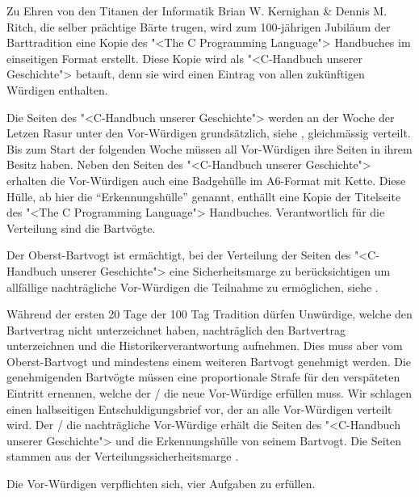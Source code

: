 \documentclass[fontsize=12pt,parskip=half]{scrartcl}
\begin{document}
\begin{contract}

  \Clause[title={"<C-Handbuch unserer Geschichte">}]
  Zu Ehren von den Titanen der Informatik Brian W. Kernighan \& Dennis M. Ritch, die selber prächtige Bärte trugen,
  wird zum 100-jährigen Jubiläum der Barttradition eine Kopie des "<The C Programming Language"> Handbuches im
  einseitigen Format erstellt. Diese Kopie wird als "<C-Handbuch unserer Geschichte"> betauft, denn sie wird einen
  Eintrag von allen zukünftigen Würdigen enthalten.

  \Clause[title={Verteilung}]
  Die Seiten des "<C-Handbuch unserer Geschichte"> werden an der Woche der Letzen Rasur unter den Vor-Würdigen grundsätzlich, siehe , gleichmässig verteilt.
  Bis zum Start der folgenden Woche müssen all Vor-Würdigen ihre Seiten in ihrem Besitz haben.
  Neben den Seiten des "<C-Handbuch unserer Geschichte">
  erhalten die Vor-Würdigen auch eine Badgehülle im A6-Format mit Kette. Diese Hülle, ab hier die ``Erkennungshülle'' genannt, enthällt eine Kopie der
  Titelseite des "<The C Programming Language"> Handbuches. Verantwortlich für die Verteilung sind die Bartvögte.

  \SubClause[title={Verteilungssicherheitsmarge}]\label{H.verteilungsmarge}
  Der Oberst-Bartvogt ist ermächtigt, bei der Verteilung der Seiten des "<C-Handbuch unserer Geschichte"> eine Sicherheitsmarge zu berücksichtigen um allfällige nachträgliche Vor-Würdigen
  die Teilnahme zu ermöglichen, siehe .

  \Clause[title={Nachträgliche Vor-Würdige}]\label{H.nachzug}
  Während der ersten 20 Tage der 100 Tag Tradition dürfen Unwürdige, welche den Bartvertrag nicht unterzeichnet haben, nachträglich den Bartvertrag unterzeichnen und die Historikerverantwortung
  aufnehmen. Dies muss aber vom Oberst-Bartvogt und mindestens einem weiteren Bartvogt genehmigt werden. Die genehmigenden Bartvögte müssen eine proportionale Strafe für den verspäteten Eintritt ernennen,
  welche der / die neue Vor-Würdige erfüllen muss. Wir schlagen einen halbseitigen Entschuldigungsbrief vor, der an alle Vor-Würdigen verteilt wird. Der / die nachträgliche Vor-Würdige erhält die Seiten des "<C-Handbuch unserer Geschichte">
  und die Erkennungshülle von seinem Bartvogt. Die Seiten stammen aus der Verteilungssicherheitsmarge .

  \Clause[title={Erkennungs-, Schutz-, Vorweis-, Wissensaufgabe}] \label{H.aufgaben}
  Die Vor-Würdigen verpflichten sich, vier Aufgaben zu erfüllen.


\end{contract}
\end{document}
